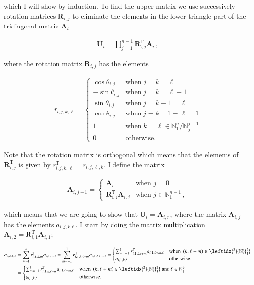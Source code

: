 \documentclass[11pt,english,a4paper]{article}
\begin{document}
\begin{flushleft}
which I will show by induction. To find the upper matrix we use successively rotation matrices $\textbf{R}_{i,j}$ to eliminate the elements in the lower triangle part of the tridiagonal matrix $\textbf{A}_i$ 

\begin{align*}
\textbf{U}_i = \prod_{j=1}^{n-1} \textbf{R}_{i,j}^{\text{T}} \textbf{A}_i \,,
\end{align*}

where the rotation matrix $\textbf{R}_{i,j}$ has the elements

\begin{align*}
r_{i,j,k,\ell} = \begin{cases} \cos\theta_{i,j} & \text{when } j=k=\ell \\ -\sin\theta_{i,j} & \text{when } j=k=\ell-1 \\ \sin\theta_{i,j} & \text{when } j=k-1=\ell \\ \cos\theta_{i,j} & \text{when } j = k-1 = \ell-1 \\ 1 & \text{when } k=\ell\in\mathbb{N}_1^n / \mathbb{N}_j^{j+1}  \\ 0 & \text{otherwise.}\end{cases}
\end{align*}

Note that the rotation matrix is orthogonal which means that the elements of $\textbf{R}_{i,j}^{\text{T}}$ is given by $r_{i,j,k,\ell}^{\text{T}} = r_{i,j,\ell,k}$. I define the matrix

\begin{align*}
\textbf{A}_{i,j+1} = \begin{cases}\textbf{A}_i &\text{when } j=0 \\ \textbf{R}_{i,j}^{\text{T}}\textbf{A}_{i,j} & \text{when } j\in\mathbb{N}_1^{n-1}\,, \end{cases}
\end{align*}

which means that we are going to show that $\textbf{U}_i = \textbf{A}_{i,n}$, where the matrix $\textbf{A}_{i,j}$ has the elements $a_{i,j,k\ell}$. I start by doing the matrix multiplication $\textbf{A}_{i,2} = \textbf{R}_{i,1}^{\text{T}}\textbf{A}_{i,1}$;

\begin{align*}
a_{i,2,k,\ell} &= \sum_{m=1}^n r_{i,1,k,m}^{\text{T}} a_{i,1,m,\ell} = \sum_{m=-1}^1 r_{i,1,k,\ell+m}^{\text{T}} a_{i,1,\ell+m,\ell}
= \begin{cases} \sum_{m=-1}^1 r_{i,1,k,\ell+m}^{\text{T}} a_{i,1,\ell+m,\ell} & \text{when } \p{k,\ell+m}\in{\leftidx{^2}{\mathbb{N}}{_1^2}}\\ a_{i,1,k,\ell} & \text{otherwise.}\end{cases} 
\\
&= \begin{cases} \sum_{m=-1}^1 r_{i,1,k,\ell+m}^{\text{T}} a_{i,1,\ell+m,\ell} & \text{when } \p{k,\ell+m}\in{\leftidx{^2}{\mathbb{N}}{_1^2}} \text{ and } \ell \in\mathbb{N}_1^3\\ a_{i,1,k,\ell} & \text{otherwise.}\end{cases}
\end{align*}


\end{flushleft}
\end{document}
